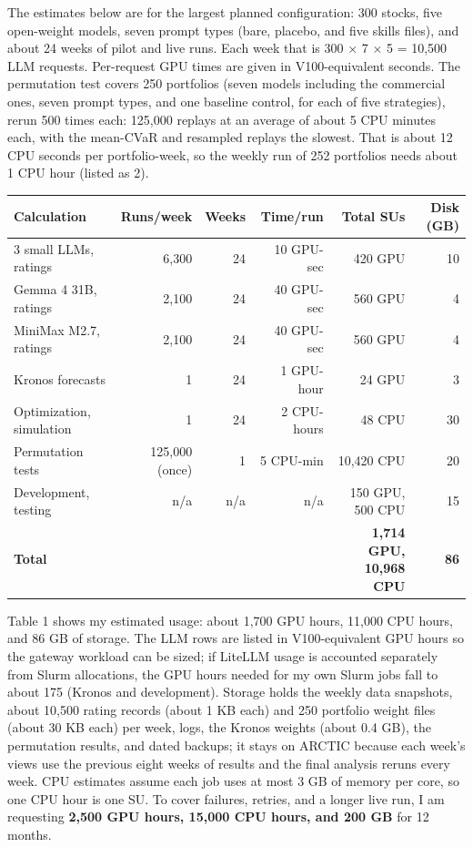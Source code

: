 \documentclass[11pt,letterpaper]{article}
\begin{document}
The estimates below are for the largest planned configuration: 300 stocks, five open-weight models, seven prompt types (bare, placebo, and five skills files), and about 24 weeks of pilot and live runs. Each week that is 300 $\times$ 7 $\times$ 5 = 10,500 LLM requests. Per-request GPU times are given in V100-equivalent seconds. The permutation test covers 250 portfolios (seven models including the commercial ones, seven prompt types, and one baseline control, for each of five strategies), rerun 500 times each: 125,000 replays at an average of about 5 CPU minutes each, with the mean-CVaR and resampled replays the slowest. That is about 12 CPU seconds per portfolio-week, so the weekly run of 252 portfolios needs about 1 CPU hour (listed as 2).

\noindent\begin{minipage}{\linewidth}\centering\setlength{\tabcolsep}{4pt}
\begin{tabular}{lrrrrr}
\toprule
Calculation & Runs/week & Weeks & Time/run & Total SUs & Disk (GB) \\
\midrule
3 small LLMs, ratings & 6,300 & 24 & 10 GPU-sec & 420 GPU & 10 \\
Gemma 4 31B, ratings & 2,100 & 24 & 40 GPU-sec & 560 GPU & 4 \\
MiniMax M2.7, ratings & 2,100 & 24 & 40 GPU-sec & 560 GPU & 4 \\
Kronos forecasts & 1 & 24 & 1 GPU-hour & 24 GPU & 3 \\
Optimization, simulation & 1 & 24 & 2 CPU-hours & 48 CPU & 30 \\
Permutation tests & 125,000 (once) & 1 & 5 CPU-min & 10,420 CPU & 20 \\
Development, testing & n/a & n/a & n/a & 150 GPU, 500 CPU & 15 \\
\midrule
\textbf{Total} & & & & \textbf{1,714 GPU,} \textbf{10,968 CPU} & \textbf{86} \\
\bottomrule
\end{tabular}
\end{minipage}


Table 1 shows my estimated usage: about 1,700 GPU hours, 11,000 CPU hours, and 86 GB of storage. The LLM rows are listed in V100-equivalent GPU hours so the gateway workload can be sized; if LiteLLM usage is accounted separately from Slurm allocations, the GPU hours needed for my own Slurm jobs fall to about 175 (Kronos and development). Storage holds the weekly data snapshots, about 10,500 rating records (about 1 KB each) and 250 portfolio weight files (about 30 KB each) per week, logs, the Kronos weights (about 0.4 GB), the permutation results, and dated backups; it stays on ARCTIC because each week's views use the previous eight weeks of results and the final analysis reruns every week. CPU estimates assume each job uses at most 3 GB of memory per core, so one CPU hour is one SU. To cover failures, retries, and a longer live run, I am requesting \textbf{2,500 GPU hours, 15,000 CPU hours, and 200 GB} for 12 months.
\end{document}
